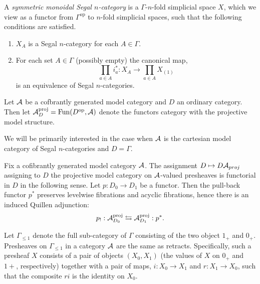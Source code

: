 \documentclass[a4paper]{amsart}
\begin{document}

\begin{definition}
	A {\em symmetric monoidal Segal $n$-category} is a $\Gamma$-$n$-fold simplicial space $X$, which we view as a functor from $\Gamma^\textrm{op}$ to $n$-fold simplicial spaces, such that the following conditions are satisfied. 
	\begin{enumerate}
		\item $X_A$ is a Segal $n$-category for each $A \in \Gamma$. 
		\item For each set $A \in \Gamma$ (possibly empty) the canonical map,
		\begin{equation*}
			\prod_{a \in A} i_a^*: X_A \to \prod_{a \in A} X_{(1)}
		\end{equation*}
		is an equivalence of Segal $n$-categories. 
	\end{enumerate}
\end{definition}


\begin{definition}
	Let $\mathcal A$ be a cofbrantly generated model category and $D$ an ordinary category. Then let $\mathcal A_D^{\textrm{proj}} = \operatorname{Fun}(D^{\mathrm{op}}, \mathcal A)$ denote the functors category with the projective model structure. 
\end{definition}

We will be primarily interested in the case when $\mathcal A$ is the cartesian model category of Segal $n$-categories and $D=\Gamma$. 


Fix a cofibrantly generated model category $\mathcal A$. The assignment $D \mapsto D\mathcal A_{proj}$ assigning to $D$ the projective model category on $\mathcal A$-valued presheaves is functorial in $D$ in the following sense. Let $p:D_0 \to D_1$ be a functor. Then the pull-back functor $p^*$ preserves levelwise fibrations and acyclic fibrations, hence  there is an induced Quillen adjunction:
\begin{equation*}
	p_!: \mathcal A_{D_0}^{\textrm{proj}} \leftrightarrows \mathcal A_{D_1}^{\textrm{proj}}: p^*.
\end{equation*}




Let $\Gamma_{\leq 1}$ denote the full sub-category of $\Gamma$ consisting of the two object $1_+$ and $0_+$. Presheaves on $\Gamma_{\leq 1}$ in a category $\mathcal A$ are the same as retracts. Specifically, such a presheaf $X$ consists of a pair of objects $(X_0, X_1)$ (the values of $X$ on $0_+$ and $1+$, respectively) together with a pair of maps, $i:X_0 \to X_1$ and $r:X_1 \to X_0$, such that the composite $ri$ is the identity on $X_0$. 
\end{document}
